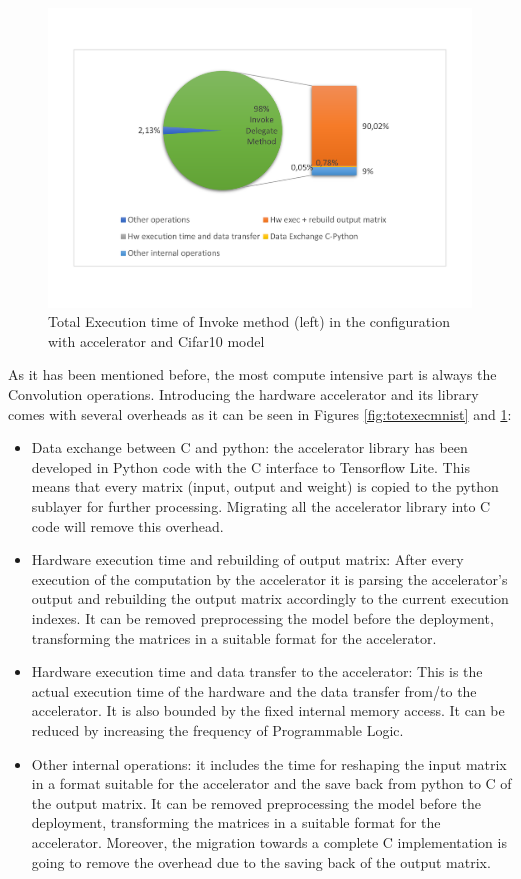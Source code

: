 \begin{figure}[!htbp]
\centering
\captionsetup{justification=centering}
\includegraphics[scale=0.55,angle=0]{./figure/graphs/latency_subdivision_cifar10.pdf}
\caption{Total Execution time of Invoke method (left) in the configuration with accelerator and Cifar10 model}
\label{fig:totexeccifar10}
\end{figure}
\newpage
As it has been mentioned before, the most compute intensive part is always the Convolution operations. Introducing the hardware accelerator and its library comes with several overheads as it can be seen in Figures \ref{fig:totexecmnist} and \ref{fig:totexeccifar10}:\\
\begin{itemize}
\item Data exchange between C and python: the accelerator library has been developed in Python code with the C interface to Tensorflow Lite. This means that every matrix (input, output and weight) is copied to the python sublayer for further processing. Migrating all the accelerator library into C code will remove this overhead.
\item Hardware execution time and rebuilding of output matrix: After every execution of the computation by the accelerator it is parsing the accelerator's output and rebuilding the output matrix accordingly to the current execution indexes. It can be removed preprocessing the model before the deployment, transforming the matrices in a suitable format for the accelerator.
\item Hardware execution time and data transfer to the accelerator: This is the actual execution time of the hardware and the data transfer from/to the accelerator. It is also bounded by the fixed internal memory access. It can be reduced by increasing the frequency of Programmable Logic.
\item Other internal operations: it includes the time for reshaping the input matrix in a format suitable for the accelerator and the save back from python to C of the output matrix. It can be removed preprocessing the model before the deployment, transforming the matrices in a suitable format for the accelerator. Moreover, the migration towards a complete C implementation is going to remove the overhead due to the saving back of the output matrix.\\
\end{itemize}
